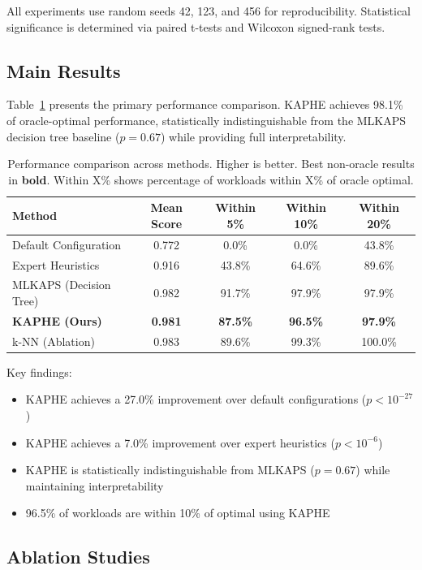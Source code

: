 \documentclass[11pt,a4paper]{article}
\begin{document}
All experiments use random seeds 42, 123, and 456 for reproducibility. Statistical significance is determined via paired t-tests and Wilcoxon signed-rank tests.

\subsection{Main Results}

Table~\ref{tab:main} presents the primary performance comparison. KAPHE achieves 98.1\% of oracle-optimal performance, statistically indistinguishable from the MLKAPS decision tree baseline ($p = 0.67$) while providing full interpretability.

\begin{table}[t]
\caption{Performance comparison across methods. Higher is better. Best non-oracle results in \textbf{bold}. Within X\% shows percentage of workloads within X\% of oracle optimal.}
\label{tab:main}
\centering
\begin{tabular}{lcccc}
\toprule
Method & Mean Score & Within 5\% & Within 10\% & Within 20\% \\
\midrule
Default Configuration & 0.772 & 0.0\% & 0.0\% & 43.8\% \\
Expert Heuristics & 0.916 & 43.8\% & 64.6\% & 89.6\% \\
MLKAPS (Decision Tree) & 0.982 & 91.7\% & 97.9\% & 97.9\% \\
\textbf{KAPHE (Ours)} & \textbf{0.981} & \textbf{87.5\%} & \textbf{96.5\%} & \textbf{97.9\%} \\
k-NN (Ablation) & 0.983 & 89.6\% & 99.3\% & 100.0\% \\
\bottomrule
\end{tabular}
\end{table}

Key findings:
\begin{itemize}
    \item KAPHE achieves a 27.0\% improvement over default configurations ($p < 10^{-27}$)
    \item KAPHE achieves a 7.0\% improvement over expert heuristics ($p < 10^{-6}$)
    \item KAPHE is statistically indistinguishable from MLKAPS ($p = 0.67$) while maintaining interpretability
    \item 96.5\% of workloads are within 10\% of optimal using KAPHE
\end{itemize}

\subsection{Ablation Studies}
\end{document}
